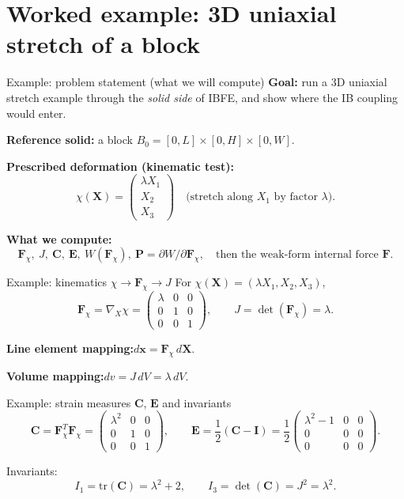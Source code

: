 \documentclass[aspectratio=169]{beamer}
\newcommand{\x}{\bm{x}}
\newcommand{\X}{\bm{X}}
\newcommand{\I}{\bm{I}}
\newcommand{\gradX}{\nabla_{\!X}}
\newcommand{\Cten}{\bm{C}}     %
\newcommand{\Eten}{\bm{E}}     %
\newcommand{\Pten}{\bm{P}}        %
\newcommand{\Fdef}{\bm{F}_{\chi}} %
\newcommand{\FLag}{\bm{F}}       %
\begin{document}
% 
\section{Worked example: 3D uniaxial stretch of a block}

\begin{frame}{Example: problem statement (what we will compute)}
\small
\textbf{Goal:} run a 3D uniaxial stretch example through the \emph{solid side} of IBFE,
and show where the IB coupling would enter.

\medskip
\textbf{Reference solid:} a block \(B_0 = [0,L]\times[0,H]\times[0,W]\).

\medskip
\textbf{Prescribed deformation (kinematic test):}
\[
\chi(\X)=
\begin{pmatrix}
\lambda X_1\\
X_2\\
X_3
\end{pmatrix}
\quad \text{(stretch along \(X_1\) by factor \(\lambda\)).}
\]

\medskip
\textbf{What we compute:}
\[
\Fdef,\ J,\ \Cten,\ \Eten,\ W(\Fdef),\ \Pten=\partial W/\partial \Fdef,
\quad\text{then the weak-form internal force } \FLag.
\]

\end{frame}

\begin{frame}{Example: kinematics \(\chi \rightarrow \Fdef \rightarrow J\)}
\small
For \(\chi(\X)=(\lambda X_1, X_2, X_3)\),
\[
\Fdef = \gradX\chi =
\begin{pmatrix}
\lambda & 0 & 0\\
0 & 1 & 0\\
0 & 0 & 1
\end{pmatrix},
\qquad
J=\det(\Fdef)=\lambda.
\]

\medskip
\textbf{Line element mapping:}\quad \(d\x=\Fdef\,d\X\).

\medskip
\textbf{Volume mapping:}\quad \(dv = J\,dV = \lambda\,dV\).


\end{frame}

\begin{frame}{Example: strain measures \(\Cten\), \(\Eten\) and invariants}
\small
\[
\Cten=\Fdef^T\Fdef=
\begin{pmatrix}
\lambda^2 & 0 & 0\\
0 & 1 & 0\\
0 & 0 & 1
\end{pmatrix},
\qquad
\Eten=\frac12(\Cten-\I)
=\frac12
\begin{pmatrix}
\lambda^2-1 & 0 & 0\\
0 & 0 & 0\\
0 & 0 & 0
\end{pmatrix}.
\]

\medskip
Invariants:
\[
I_1=\mathrm{tr}(\Cten)=\lambda^2+2,
\qquad
I_3=\det(\Cten)=J^2=\lambda^2.
\]


\end{frame}
\end{document}
